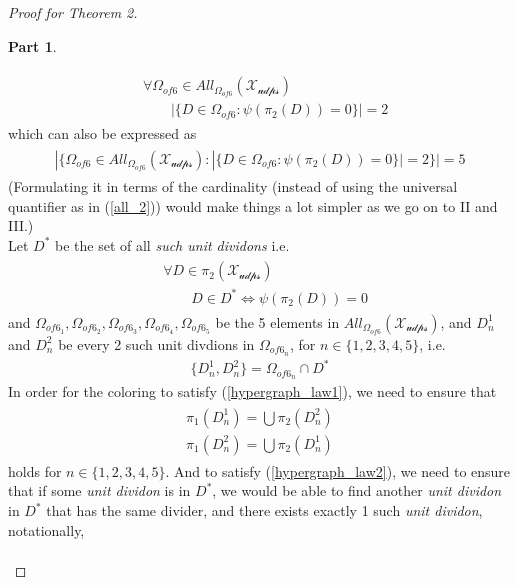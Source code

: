 \documentclass[11pt, oneside]{article}      %
\theoremstyle{definition}
\newtheorem{proofpart}{Part}[theo]
\numberwithin{equation}{section}
\newcommand{\reff}[1]{(\ref{#1})}
\theoremstyle{c}
\begin{document}
\begin{proof}[Proof for Theorem 2]
\begin{proofpart}
\begin{enumerate}[I.]
\begin{align}
\begin{split}\label{all_2}
&\forall  \Omega_{of 6}  \in All_{\Omega_{of 6}}(\mathscr{X_{udps}}) \\
&\qquad  |\{D \in \Omega_{of 6} : \psi(\pi_2(D)) = 0 \}| = 2
\end{split}
\end{align}
which can also be expressed as
\begin{align}
\begin{split} \label{all_2_alt}
|\{ \Omega_{of 6}  \in All_{\Omega_{of 6}}(\mathscr{X_{udps}}) :  |\{D \in \Omega_{of 6} : \psi(\pi_2(D)) = 0 \}| = 2 \}| = 5
\end{split}
\end{align}
(Formulating it in terms of the cardinality (instead of using the universal quantifier as in \reff{all_2}) would make things a lot simpler as we go on to II and III.)
\\
Let $D^*$ be the set of all \textit{such unit dividons} i.e. 
\begin{align}
\begin{split}
&\forall D \in \pi_2(\mathscr{X_{udps}}) \\
&\qquad D \in D^* \Leftrightarrow \psi(\pi_2(D)) = 0 
\end{split}
\end{align}
and $\Omega_{of 6_1}, \Omega_{of 6_2}, \Omega_{of 6_3}, \Omega_{of 6_4}, \Omega_{of 6_5}$ be the 5 elements in $All_{\Omega_{of 6}}(\mathscr{X_{udps}})$, and $D_n^1$ and $D_n^2$ be every 2 such unit divdions in $\Omega_{of 6_n}$, for $n \in \{1,2,3,4,5\}$, i.e. 
\begin{align}
\{D_n^1,D_n^2\} = \Omega_{of 6_n} \cap D^* 
\end{align}
In order for the coloring to satisfy \reff{hypergraph_law1}, we need to ensure that
\begin{align}\label{same-divider-diving-points}
\begin{split}
\pi_1(D_n^1) =  \bigcup \pi_2(D_n^2) \\
\pi_1(D_n^2) =  \bigcup \pi_2(D_n^1)
\end{split}
\end{align}
holds for $n \in \{1,2,3,4,5\}$. And to satisfy \reff{hypergraph_law2}, we need to ensure that if some \textit{unit dividon} is in $D^*$, we would be able to find another \textit{unit dividon} in $D^*$ that has the same divider, and there exists exactly 1 such \textit{unit dividon}, notationally,
\begin{align}\label{exists-2-dividon-of-same-divider}

\end{align}
\end{enumerate}
\end{proofpart}
\end{proof}
\end{document}
